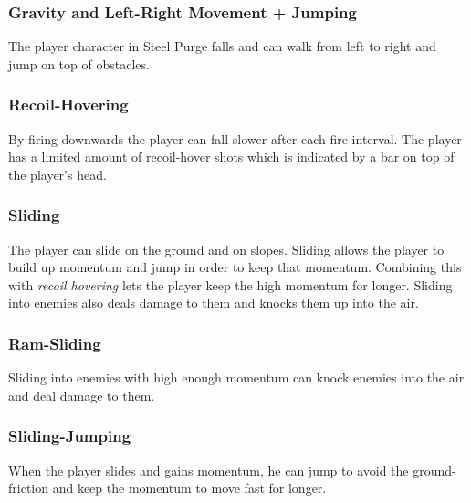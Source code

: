 \documentclass[../Main.tex]{subfiles}
\begin{document}
\subsubsection{Gravity and Left-Right Movement + Jumping}

The player character in Steel Purge falls and can walk from left to right and jump on top of obstacles.

\subsubsection{Recoil-Hovering}

By firing downwards the player can fall slower after each fire interval. The player has a limited amount of recoil-hover shots which is indicated by a bar on top of the player's head. 

\subsubsection{Sliding}

The player can slide on the ground and on slopes. Sliding allows the player to build up momentum and jump in order to keep that momentum. Combining this with \emph{recoil hovering} lets the player keep the high momentum for longer. Sliding into enemies also deals damage to them and knocks them up into the air. 

\subsubsection{Ram-Sliding}

Sliding into enemies with high enough momentum can knock enemies into the air and deal damage to them. 

\subsubsection{Sliding-Jumping}

When the player slides and gains momentum, he can jump to avoid the ground-friction and keep the momentum to move fast for longer.
\end{document}
